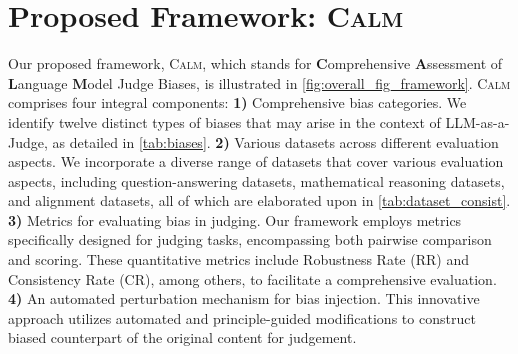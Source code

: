 \documentclass{article} %
\newcommand{\header}[1]{\noindent\textbf{{#1}}~~}
\begin{document}

\section{Proposed Framework: \textsc{Calm}}
\vspace{-1em}
Our proposed framework, \textsc{Calm}, which stands for \textbf{C}omprehensive \textbf{A}ssessment of \textbf{L}anguage \textbf{M}odel Judge Biases, is illustrated in \autoref{fig:overall_fig_framework}. \textsc{Calm} comprises four integral components: \textbf{1)} Comprehensive bias categories. We identify twelve distinct types of biases that may arise in the context of LLM-as-a-Judge, as detailed in \autoref{tab:biases}. %
\textbf{2)} Various datasets across different evaluation aspects. We incorporate a diverse range of datasets that cover various evaluation aspects, including question-answering datasets, mathematical reasoning datasets, and alignment datasets, all of which are elaborated upon in \autoref{tab:dataset_consist}. \textbf{3)} Metrics for evaluating bias in judging.   Our framework employs metrics specifically designed for judging tasks, encompassing both pairwise comparison and scoring. These quantitative metrics include Robustness Rate (RR) and Consistency Rate (CR), among others, to facilitate a comprehensive evaluation. \textbf{4)} An automated  perturbation mechanism for bias injection. This innovative approach utilizes automated and principle-guided modifications to construct biased counterpart of the original content for   judgement. 
\end{document}
